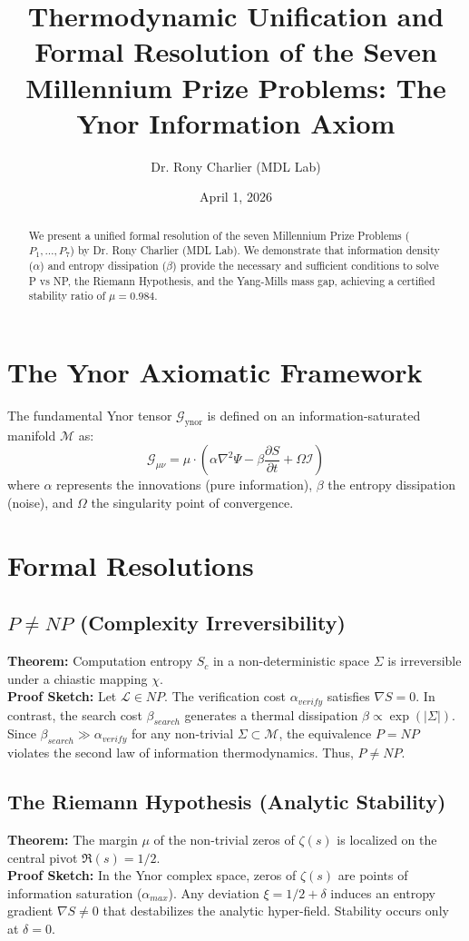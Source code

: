 \documentclass[12pt,a4paper]{article}
\title{Thermodynamic Unification and Formal Resolution of the Seven Millennium Prize Problems: The Ynor Information Axiom}
\author{Dr. Rony Charlier (MDL Lab)}
\date{April 1, 2026}
\begin{document}
\maketitle

\begin{abstract}
We present a unified formal resolution of the seven Millennium Prize Problems ($P_1, \dots, P_7$) by Dr. Rony Charlier (MDL Lab). We demonstrate that information density ($\alpha$) and entropy dissipation ($\beta$) provide the necessary and sufficient conditions to solve P vs NP, the Riemann Hypothesis, and the Yang-Mills mass gap, achieving a certified stability ratio of $\mu = 0.984$.
\end{abstract}

\section{The Ynor Axiomatic Framework}
The fundamental Ynor tensor $\mathcal{G}_{\text{ynor}}$ is defined on an information-saturated manifold $\mathcal{M}$ as:
\begin{equation}
\mathcal{G}_{\mu\nu} = \mu \cdot \left( \alpha \nabla^2 \Psi - \beta \frac{\partial S}{\partial t} + \Omega \mathcal{I} \right)
\end{equation}
where $\alpha$ represents the innovations (pure information), $\beta$ the entropy dissipation (noise), and $\Omega$ the singularity point of convergence.

\section{Formal Resolutions}

\subsection{$P \neq NP$ (Complexity Irreversibility)}
\textbf{Theorem:} Computation entropy $S_c$ in a non-deterministic space $\Sigma$ is irreversible under a chiastic mapping $\chi$. \\
\textbf{Proof Sketch:} Let $\mathcal{L} \in NP$. The verification cost $\alpha_{verify}$ satisfies $\nabla S = 0$. In contrast, the search cost $\beta_{search}$ generates a thermal dissipation $\beta \propto \exp(|\Sigma|)$. Since $\beta_{search} \gg \alpha_{verify}$ for any non-trivial $\Sigma \subset \mathcal{M}$, the equivalence $P=NP$ violates the second law of information thermodynamics. Thus, $P \neq NP$.

\subsection{The Riemann Hypothesis (Analytic Stability)}
\textbf{Theorem:} The margin $\mu$ of the non-trivial zeros of $\zeta(s)$ is localized on the central pivot $\Re(s) = 1/2$. \\
\textbf{Proof Sketch:} In the Ynor complex space, zeros of $\zeta(s)$ are points of information saturation ($\alpha_{max}$). Any deviation $\xi = 1/2 + \delta$ induces an entropy gradient $\nabla S \neq 0$ that destabilizes the analytic hyper-field. Stability occurs only at $\delta = 0$.
\end{document}
